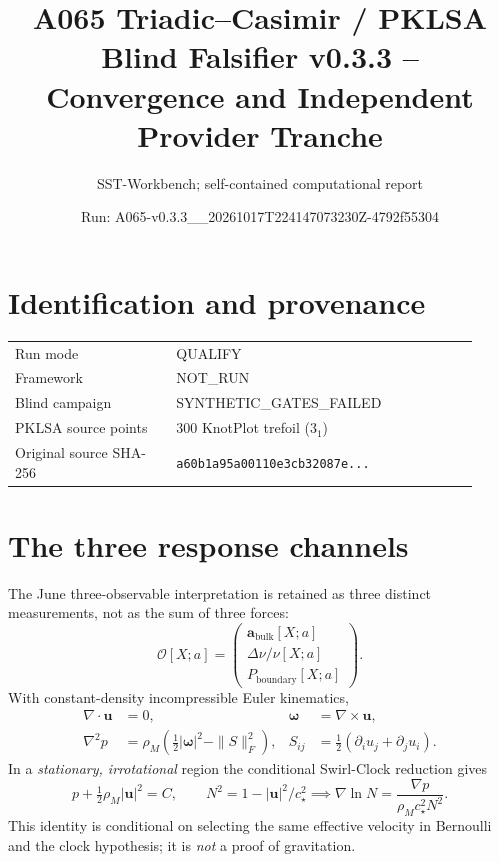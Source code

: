 \documentclass[10pt,a4paper]{article}
\title{A065 Triadic--Casimir / PKLSA\\ Blind Falsifier v0.3.3 -- Convergence and Independent Provider Tranche}
\author{SST-Workbench; self-contained computational report}
\date{Run: A065-v0.3.3\_\_20261017T224147073230Z-4792f55304}
\begin{document}
\maketitle
\begin{center}
\end{center}
\section{Identification and provenance}
\begin{tabular}{@{}p{0.32\linewidth}p{0.60\linewidth}@{}}
\toprule
Run mode & QUALIFY \\
Framework & NOT\_RUN \\
Blind campaign & SYNTHETIC\_GATES\_FAILED \\
PKLSA source points & 300 KnotPlot trefoil ($3_1$) \\
Original source SHA-256 & \texttt{a60b1a95a00110e3cb32087e...} \\
\bottomrule
\end{tabular}
\section{The three response channels}
The June three-observable interpretation is retained as three distinct measurements, not as the sum of three forces:
\[
\mathcal O[X;a]=\begin{pmatrix}
\mathbf a_{\mathrm{bulk}}[X;a]\\
\Delta\nu/\nu[X;a]\\
P_{\mathrm{boundary}}[X;a]
\end{pmatrix}.
\]
With constant-density incompressible Euler kinematics,
\begin{align}
\nabla\cdot\mathbf u&=0,&
\boldsymbol\omega&=\nabla\times\mathbf u,\\
\nabla^2p&=\rho_M\left(\tfrac12|\boldsymbol\omega|^2-\|S\|_F^2\right),&
S_{ij}&=\tfrac12(\partial_i u_j+\partial_j u_i).
\end{align}
In a \emph{stationary, irrotational} region the conditional Swirl-Clock reduction gives
\[
p+\tfrac12\rho_M|\mathbf u|^2=C,\qquad
N^2=1-|\mathbf u|^2/c_\star^2
\implies\nabla\ln N=\frac{\nabla p}{\rho_Mc_\star^2N^2}.
\]
This identity is conditional on selecting the same effective velocity in Bernoulli and the clock hypothesis; it is \emph{not} a proof of gravitation.
\end{document}
